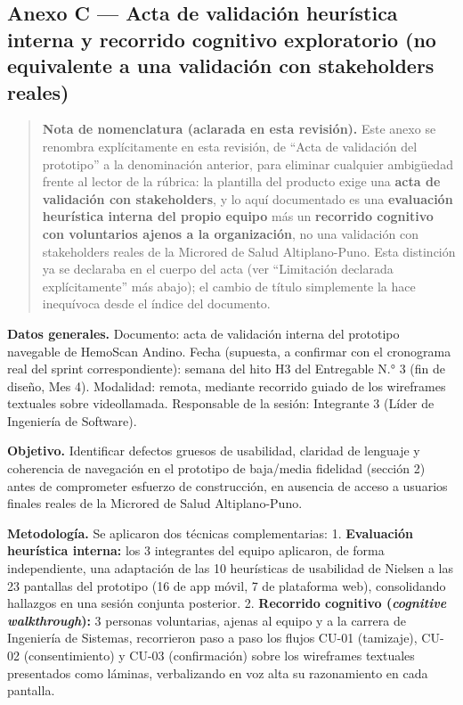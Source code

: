 \documentclass[11pt,a4paper]{article}
\begin{document}
\subsection{Anexo C --- Acta de validación heurística interna y recorrido cognitivo exploratorio (no equivalente a una validación con stakeholders reales)}\label{anexo-c-acta-de-validaciuxf3n-heuruxedstica-interna-y-recorrido-cognitivo-exploratorio-no-equivalente-a-una-validaciuxf3n-con-stakeholders-reales}

\begin{quote}
\textbf{Nota de nomenclatura (aclarada en esta revisión).} Este anexo se renombra explícitamente en esta revisión, de ``Acta de validación del prototipo'' a la denominación anterior, para eliminar cualquier ambigüedad frente al lector de la rúbrica: la plantilla del producto exige una \textbf{acta de validación con stakeholders}, y lo aquí documentado es una \textbf{evaluación heurística interna del propio equipo} más un \textbf{recorrido cognitivo con voluntarios ajenos a la organización}, no una validación con stakeholders reales de la Microred de Salud Altiplano-Puno. Esta distinción ya se declaraba en el cuerpo del acta (ver ``Limitación declarada explícitamente'' más abajo); el cambio de título simplemente la hace inequívoca desde el índice del documento.
\end{quote}

\textbf{Datos generales.} Documento: acta de validación interna del prototipo navegable de HemoScan Andino. Fecha (supuesta, a confirmar con el cronograma real del sprint correspondiente): semana del hito H3 del Entregable N.° 3 (fin de diseño, Mes 4). Modalidad: remota, mediante recorrido guiado de los wireframes textuales sobre videollamada. Responsable de la sesión: Integrante 3 (Líder de Ingeniería de Software).

\textbf{Objetivo.} Identificar defectos gruesos de usabilidad, claridad de lenguaje y coherencia de navegación en el prototipo de baja/media fidelidad (sección 2) antes de comprometer esfuerzo de construcción, en ausencia de acceso a usuarios finales reales de la Microred de Salud Altiplano-Puno.

\textbf{Metodología.} Se aplicaron dos técnicas complementarias:
1. \textbf{Evaluación heurística interna:} los 3 integrantes del equipo aplicaron, de forma independiente, una adaptación de las 10 heurísticas de usabilidad de Nielsen a las 23 pantallas del prototipo (16 de app móvil, 7 de plataforma web), consolidando hallazgos en una sesión conjunta posterior.
2. \textbf{Recorrido cognitivo (\emph{cognitive walkthrough}):} 3 personas voluntarias, ajenas al equipo y a la carrera de Ingeniería de Sistemas, recorrieron paso a paso los flujos CU-01 (tamizaje), CU-02 (consentimiento) y CU-03 (confirmación) sobre los wireframes textuales presentados como láminas, verbalizando en voz alta su razonamiento en cada pantalla.
\end{document}
